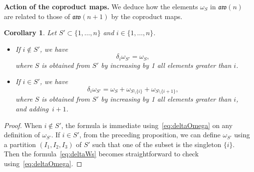\documentclass[pdftex]{sigma}
\numberwithin{equation}{section}
\newtheorem{coro}[theo]{Corollary}
\theoremstyle{definition}
\begin{document}
{\bf Action of the coproduct maps.} We deduce how the elements $\omega_S$ in $\mathfrak{aw}(n)$ are related to those of $\mathfrak{aw}(n+1)$ by the coproduct maps.
\begin{coro}\label{coro:deltaW}
Let $S'\subset\{1,\dots,n\}$ and $i\in\{1,\dots,n\}$.
\begin{itemize}\itemsep=0pt
\item If $i\notin S'$, we have
\begin{equation*}
\delta_i\omega_{S'}= \omega_{S} ,
\end{equation*}
where $S$ is obtained from $S'$ by increasing by 1 all elements greater than $i$.
\item If $i\in S'$, we have
\begin{equation}\label{eq:deltaWs}
\delta_i\omega_{S'}= \omega_{S} +\omega_{S\setminus\{i\}}+\omega_{S\setminus\{i+1\}},
\end{equation}
where $S$ is obtained from $S'$ by increasing by 1 all elements greater than $i$, and adding~${i+1}$.
\end{itemize}
\end{coro}
\begin{proof}
When $i\notin S'$, the formula is immediate using~\eqref{eq:deltaOmega} on any definition of $\omega_{S'}$. If $i\in S'$, from the preceding proposition, we can define $\omega_{S'}$ using a partition $(I_1,I_2,I_3)$ of $S'$ such that one of the subset is the singleton $\{i\}$. Then the formula~\eqref{eq:deltaWs} becomes straightforward to check using~\eqref{eq:deltaOmega}.
\end{proof}
\end{document}
